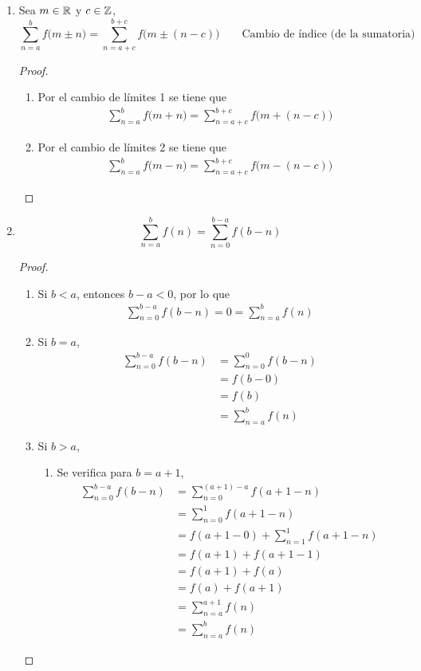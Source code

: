 \begin{enumerate}[label=\alph*)]
  \item Sea $m\in \mathbb{R}$ y $c\in \mathbb{Z}$, \[\sum_{n=a}^{b}f\bigl(m\pm n\bigr) = \sum_{n=a+c}^{b+c}f\bigl(m\pm (n- c)\bigr) \qquad \text{Cambio de índice (de la sumatoria)}\]
  \begin{proof}\leavevmode
    \begin{enumerate}[label=\roman*)]
      \item Por el cambio de límites 1 se tiene que 
      \begin{align*}
        \sum_{n=a}^{b}f\bigl(m+ n\bigr) = \sum_{n=a+c}^{b+c}f\bigl(m+ (n- c)\bigr)
      \end{align*}
      \item Por el cambio de límites 2 se tiene que
      \begin{align*}
        \sum_{n=a}^{b}f\bigl(m-n\bigr) = \sum_{n=a+c}^{b+c}f\bigl(m-(n- c)\bigr)
      \end{align*}
    \end{enumerate}
  \end{proof}

  \item \[\sum_{n=a}^{b}f(n) = \sum_{n=0}^{b-a} f(b-n)\]
  \begin{proof}\leavevmode
    \begin{enumerate}[label=\Roman*)]
    \item Si $b<a$, entonces $b-a<0$, por lo que
    \begin{align*}
      \sum_{n=0}^{b-a} f(b-n) = 0 = \sum_{n=a}^{b}f(n)
    \end{align*}
    
    \item Si $b=a$,
    \begin{align*}
      \sum_{n=0}^{b-a} f(b-n) &= \sum_{n=0}^{0} f(b-n)\\
      &= f(b-0)\\
      &= f(b)\\
      &= \sum_{n=a}^{b} f(n)
    \end{align*}
    

    \item Si $b>a$,
    \begin{enumerate}[label=\roman*)]
      \item Se verifica para $b=a+1$,
      \begin{align*}
        \sum_{n=0}^{b-a} f(b-n) &= \sum_{n=0}^{(a+1)-a} f(a+1-n)\\
        &= \sum_{n=0}^{1} f(a+1-n)\\
        &= f(a+1-0) + \sum_{n=1}^{1} f(a+1-n)\\
        &= f(a+1) + f(a+1-1)\\
        &= f(a+1) + f(a)\\
        &= f(a) + f(a+1)\\
        &= \sum_{n=a}^{a+1} f(n)\\
        &= \sum_{n=a}^{b} f(n)
      \end{align*}


\end{enumerate}
\end{enumerate}
\end{proof}
\end{enumerate}
